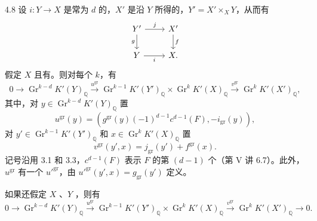 \begin{SGAresult}{}{4.8}
设 $i:Y\to X$ 是常为 $d$ 的，$X'$ 是沿 $Y$ 所得的，$Y'=X'\times_XY$，从而有
\[
\begin{tikzcd}
Y'\arrow[r,"j"]\arrow[d,"g"']&X'\arrow[d,"f"]\\
Y\arrow[r,"i"']&X.
\end{tikzcd}
\]
假定 $X$ 且有。则对每个 $k$，有
\[
0\longrightarrow\operatorname{Gr}^{k-d}K'(Y)_{\mathbb Q}
\xrightarrow{u^{\mathrm{gr}}}\operatorname{Gr}^{k-1}K'(Y')_{\mathbb Q}\times\operatorname{Gr}^kK'(X)_{\mathbb Q}
\xrightarrow{v^{\mathrm{gr}}}\operatorname{Gr}^kK'(X')_{\mathbb Q},
\]
其中，对 $y\in\operatorname{Gr}^{k-d}K'(Y)_{\mathbb Q}$ 置
\[
u^{\mathrm{gr}}(y)=(g^{\mathrm{gr}}(y)(-1)^{d-1}c^{d-1}(F),-i_{\mathrm{gr}}(y)),
\]
对 $y'\in\operatorname{Gr}^{k-1}K'(Y')_{\mathbb Q}$ 和 $x\in\operatorname{Gr}^kK'(X)_{\mathbb Q}$ 置
\[
v^{\mathrm{gr}}(y',x)=j_{\mathrm{gr}}(y')+f^{\mathrm{gr}}(x).
\]
记号沿用 3.1 和 3.3，$c^{d-1}(F)$ 表示 $F$ 的第 $(d-1)$ 个（第 V 讲 6.7）。此外，$u^{\mathrm{gr}}$ 有一个 $u'^{\mathrm{gr}}$，由 $u'^{\mathrm{gr}}(y',x)=g_{\mathrm{gr}}(y')$ 定义。

如果还假定 $X$ 、$Y$ ，则有
\[
0\longrightarrow\operatorname{Gr}^{k-d}K'(Y)_{\mathbb Q}
\xrightarrow{u^{\mathrm{gr}}}\operatorname{Gr}^{k-1}K'(Y')_{\mathbb Q}\times\operatorname{Gr}^kK'(X)_{\mathbb Q}
\xrightarrow{v^{\mathrm{gr}}}\operatorname{Gr}^kK'(X')_{\mathbb Q}\longrightarrow0.
\]
\end{SGAresult}
